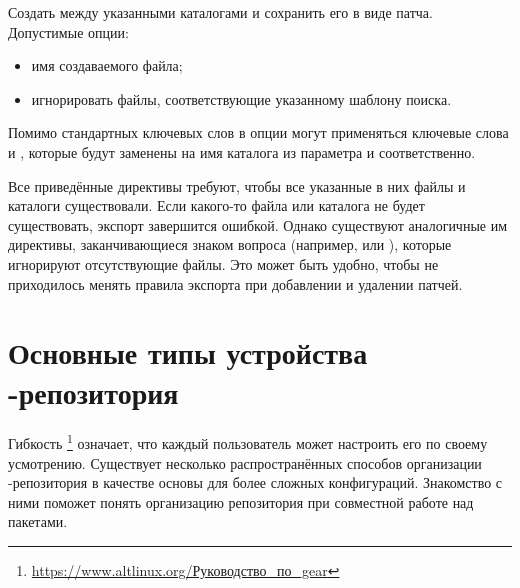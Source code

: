 \begin{itemize}
	Создать  между указанными каталогами и сохранить его в виде патча. Допустимые опции:
	\begin{itemize}
		\item {} имя создаваемого файла;
		\item {} игнорировать файлы, соответствующие указанному шаблону поиска.
	\end{itemize}
	
	Помимо стандартных ключевых слов в опции  могут применяться ключевые слова 
		и , которые будут заменены на имя каталога из параметра 
		и  соответственно.
\end{itemize}

Все приведённые директивы требуют, чтобы все указанные в них файлы и каталоги существовали. Если какого-то
файла или каталога не будет существовать, экспорт завершится ошибкой. Однако существуют аналогичные им директивы,
заканчивающиеся знаком вопроса (например,  или ), которые игнорируют отсутствующие файлы.
Это может быть удобно, чтобы не приходилось менять правила экспорта при добавлении и удалении патчей.

\section{Основные типы устройства -репозитория}
Гибкость \footnote{\href{https://www.altlinux.org/\%D0\%A0\%D1\%83\%D0\%BA\%D0\%BE\%D0\%B2\%D0\%BE\%D0\%B4\%D1\%81\%D1\%82\%D0\%B2\%D0\%BE_\%D0\%BF\%D0\%BE_gear}{https://www.altlinux.org/Руководство\_по\_gear}}
означает, что каждый пользователь может настроить его по своему усмотрению. Существует несколько
распространённых способов организации -репозитория в качестве основы для более сложных конфигураций.
Знакомство с ними поможет понять организацию репозитория при совместной работе над пакетами.

